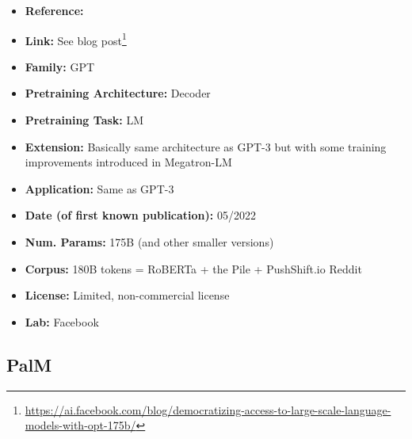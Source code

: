 \documentclass{article}
\begin{document}
            \begin{itemize}
                \item \textbf{Reference:} 
                \item \textbf{Link:} See blog post\footnote{\url{https://ai.facebook.com/blog/democratizing-access-to-large-scale-language-models-with-opt-175b/}}
                \item \textbf{Family:} GPT 
                \item \textbf{Pretraining Architecture:} Decoder
                \item \textbf{Pretraining Task:} LM
                \item \textbf{Extension:} Basically same architecture as GPT-3 but with some training improvements introduced in Megatron-LM  
                \item \textbf{Application:} Same as GPT-3
                \item \textbf{Date (of first known publication):} 05/2022
                \item \textbf{Num. Params:} 175B (and other smaller versions)
                \item \textbf{Corpus:} 180B tokens = RoBERTa + the Pile + PushShift.io Reddit
                \item \textbf{License:} Limited, non-commercial license
                \item \textbf{Lab:} Facebook
            \end{itemize}
            
\subsection{PalM}
\end{document}
